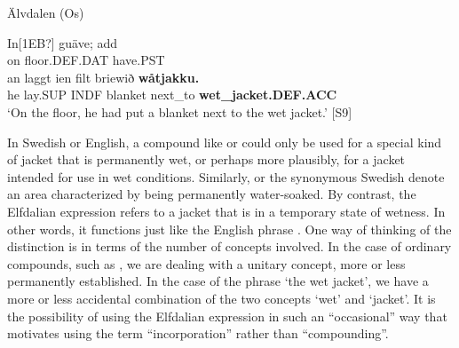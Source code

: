 
\item 

Älvdalen (Os)



 \ea\label{}
\gll In[1EB?]  guäve;  add\\


on  floor.DEF.DAT  have.PST\\

 \ea\label{}
\gll an  laggt  ien  filt  briewið  \textbf{wåtjakku.}\\


he  lay.SUP  INDF  blanket  next\_to  \textbf{wet\_jacket.DEF.ACC}\\

\glt  ‘On the floor, he had put a blanket next to the wet jacket.’ [S9]

\z

In Swedish or English, a compound like  or  could only be used for a special kind of jacket that is permanently wet, or perhaps more plausibly, for a jacket intended for use in wet conditions. Similarly,  or the synonymous Swedish  denote an area characterized by being permanently water-soaked. By contrast, the Elfdalian expression refers to a jacket that is in a temporary state of wetness. In other words, it functions just like the English phrase . One way of thinking of the distinction is in terms of the number of concepts involved. In the case of ordinary compounds, such as , we are dealing with a unitary concept, more or less permanently established. In the case of the phrase ‘the wet jacket’, we have a more or less accidental combination of the two concepts ‘wet’ and ‘jacket’. It is the possibility of using the Elfdalian expression in such an “occasional” way that motivates using the term “incorporation” rather than “compounding”. 


